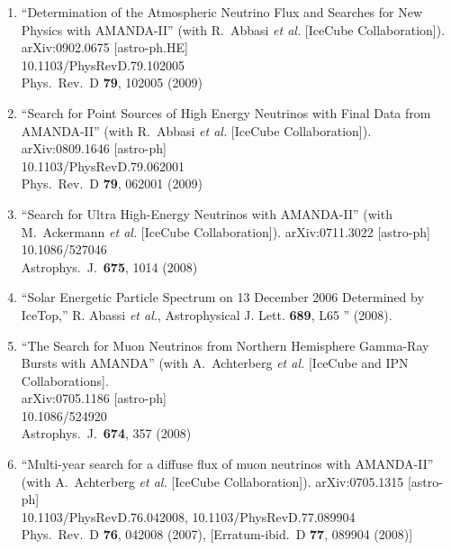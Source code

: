 \begin{enumerate}
\item ``Determination of the Atmospheric Neutrino Flux and
        Searches for New   Physics with AMANDA-II'' (with
        R.~Abbasi {\it et al.}  [IceCube
        Collaboration]).  \\{}arXiv:0902.0675 [astro-ph.HE]
        \\{}10.1103/PhysRevD.79.102005 \\{}Phys.\ Rev.\ D
        {\bf 79}, 102005   (2009) %

\item ``Search for Point Sources of High Energy Neutrinos
        with Final Data   from AMANDA-II'' (with R.~Abbasi
        {\it et al.}  [IceCube     Collaboration]).
        \\{}arXiv:0809.1646 [astro-ph]
        \\{}10.1103/PhysRevD.79.062001 \\{}Phys.\ Rev.\ D
        {\bf 79}, 062001   (2009) %

\item ``Search for Ultra High-Energy Neutrinos with
        AMANDA-II'' (with M.~Ackermann {\it et al.}
        [IceCube Collaboration]). arXiv:0711.3022 [astro-ph]
        \\{}10.1086/527046   \\{}Astrophys.\ J.\ {\bf 675},
        1014 (2008) %

\item ``Solar Energetic Particle Spectrum on 13 December
        2006 Determined   by IceTop,” R. Abassi {\it et
        al.}, Astrophysical J. Lett. {\bf 689}, L65  ''
        (2008).

\item ``The Search for Muon Neutrinos from Northern
        Hemisphere Gamma-Ray   Bursts with AMANDA'' (with
        A.~Achterberg {\it et al.}  [IceCube and     IPN
        Collaborations].  \\{}arXiv:0705.1186 [astro-ph]
        \\{}10.1086/524920 \\{}Astrophys.\ J.\ {\bf 674},
        357 (2008) %

\item ``Multi-year search for a diffuse flux of muon
        neutrinos with   AMANDA-II'' (with A.~Achterberg
        {\it et al.}  [IceCube Collaboration]).
        arXiv:0705.1315 [astro-ph]
        \\{}10.1103/PhysRevD.76.042008,
        10.1103/PhysRevD.77.089904 \\{}Phys.\ Rev.\ D {\bf
        76}, 042008   (2007), [Erratum-ibid.\ D {\bf 77},
        089904 (2008)] %


\end{enumerate}
